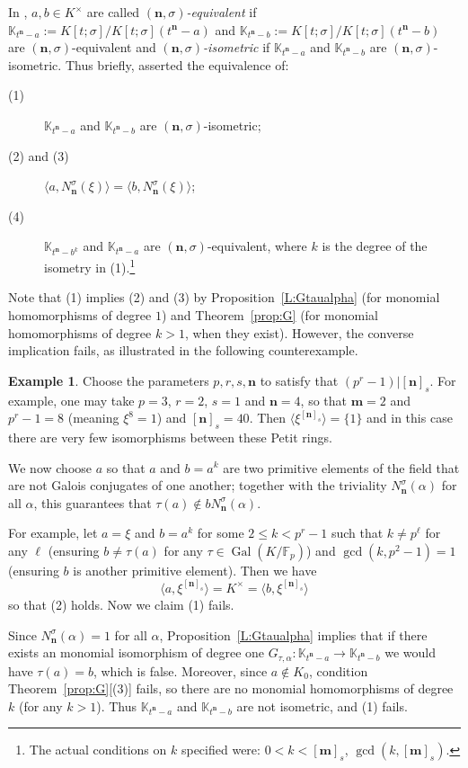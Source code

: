 \documentclass[11pt]{amsart}
\theoremstyle{plain}
\theoremstyle{definition}
\newtheorem{example}[theorem]{Example}
\numberwithin{equation}{section}
\numberwithin{figure}{section}
\newcommand{\field}{K}
\newcommand{\Kone}[1]{K[t;\sigma]/K[t;\sigma](t^{\de}-#1)}
\newcommand{\Konenew}[1]{\mathbb{K}_{t^\de-#1}}
\newcommand{\os}{\mathbf{m}}  %
\newcommand{\de}{\mathbf{n}}  %
\DeclareMathOperator{\Gal}{Gal}
\begin{document}
 In  \cite{OuazzouNajmeddineAydin2025},  $a,b\in K^\times$ are called \emph{$(\de,\sigma)$-equivalent} if  $\Konenew{a}:=\Kone{a}$ and $\Konenew{b}:=\Kone{b}$ are $(\de,\sigma)$-equivalent
  and
\emph{$(\de,\sigma)$-isometric} if  $\Konenew{a}$ and $\Konenew{b}$ are $(\de,\sigma)$-isometric.
Thus briefly, \cite[Theorem 4]{OuazzouNajmeddineAydin2025} asserted the equivalence of:
\begin{description}
\item[(1)] $\Konenew{a}$ and $\Konenew{b}$ are $(\de,\sigma)$-isometric;
\item[(2) and (3)] $\langle a, N_{\de}^\sigma(\xi)\rangle=\langle b, N_{\de}^\sigma(\xi)\rangle$;
\item[(4)] $\Konenew{b^k}$ and $\Konenew{a}$ are $(\de,\sigma)$-equivalent, where $k$ is the degree of the isometry in (1).\footnote{The actual conditions on $k$ specified were: $0<k<[\os]_{s}$, $\gcd(k,[\os]_{s})$.}
\end{description}
Note that (1) implies (2) and (3) by Proposition~\ref{L:Gtaualpha} (for monomial homomorphisms of degree $1$) and Theorem~\ref{prop:G} (for monomial homomorphisms of degree $k>1$, when they exist).
However, the converse implication fails, as illustrated in the following counterexample.


\begin{example}\label{Eg:1}
   Choose the parameters $p,r,s,\de$ to satisfy that $(p^{r}-1)|[\de]_{s}$.  For example, one may take $p=3$, $r=2$, $s=1$ and $\de=4$, so that $\os=2$ and $p^r-1=8$ (meaning $\xi^8=1$) and $[\de]_{s}=40$.
    Then $\langle \xi^{[\de]_{s}}\rangle = \{1\}$ and in this case there are very few isomorphisms between these Petit rings.

    We now choose $a$ so that $a$ and $b=a^k$ are two primitive elements of the field that are not Galois conjugates of one another; together with the triviality $N_{\de}^\sigma(\alpha)$ for all $\alpha$, this guarantees that $\tau(a)\notin bN_{\de}^\sigma(\alpha)$.

    For example, let $a=\xi$ and $b=a^k$ for some $2\leq k < p^r-1$ such that $k\neq p^\ell$ for any $\ell$ (ensuring $b\neq \tau(a)$ for any $\tau\in \Gal(\field/\mathbb{F}_p)$) and $\gcd(k,p^{2}-1)=1$ (ensuring $b$ is another primitive element).  Then we have
    $$
    \langle a, \xi^{[\de]_{s}}\rangle = \field^\times = \langle b, \xi^{[\de]_{s}}\rangle
    $$
    so that (2) holds.  Now we claim (1) fails.

    Since $N_{\de}^\sigma(\alpha)=1$ for all $\alpha$, Proposition~\ref{L:Gtaualpha} implies that if there exists an monomial isomorphism of degree one $G_{\tau,\alpha}:\Konenew{a}\to\Konenew{b}$ we would have $\tau(a)=b$, which is false. Moreover, since $a\notin \field_0$, condition Theorem~\ref{prop:G}[(3)] fails, so there are no monomial homomorphisms of degree $k$ (for any $k>1$).  Thus $\Konenew{a}$ and $\Konenew{b}$ are not isometric, and (1) fails.
\end{example}
\end{document}
